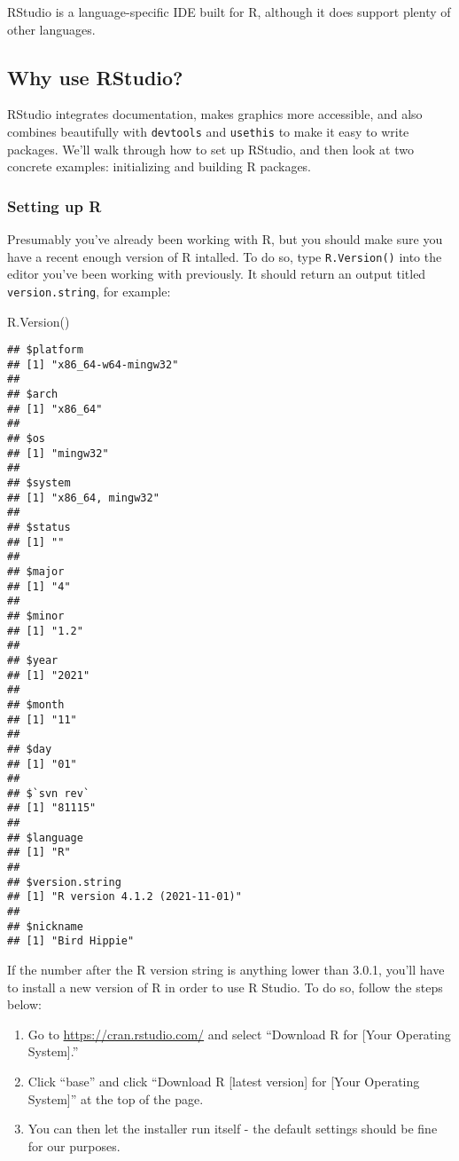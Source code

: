\documentclass[
]{book}
\newenvironment{Shaded}{\begin{snugshade}}{\end{snugshade}}
\newcommand{\FunctionTok}[1]{\textcolor[rgb]{0.00,0.00,0.00}{#1}}
\newcommand{\NormalTok}[1]{#1}
\begin{document}
RStudio is a language-specific IDE built for R, although it does support plenty of other languages.

\hypertarget{why-use-rstudio}{%
\subsection{Why use RStudio?}\label{why-use-rstudio}}

RStudio integrates documentation, makes graphics more accessible, and also combines beautifully with \texttt{devtools} and \texttt{usethis} to make it easy to write packages. We'll walk through how to set up RStudio, and then look at two concrete examples: initializing and building R packages.

\hypertarget{setting-up-r}{%
\subsubsection{Setting up R}\label{setting-up-r}}

Presumably you've already been working with R, but you should make sure you have a recent enough version of R intalled. To do so, type \texttt{R.Version()} into the editor you've been working with previously. It should return an output titled \texttt{version.string}, for example:

\begin{Shaded}
\begin{Highlighting}[]
\FunctionTok{R.Version}\NormalTok{()}
\end{Highlighting}
\end{Shaded}

\begin{verbatim}
## $platform
## [1] "x86_64-w64-mingw32"
## 
## $arch
## [1] "x86_64"
## 
## $os
## [1] "mingw32"
## 
## $system
## [1] "x86_64, mingw32"
## 
## $status
## [1] ""
## 
## $major
## [1] "4"
## 
## $minor
## [1] "1.2"
## 
## $year
## [1] "2021"
## 
## $month
## [1] "11"
## 
## $day
## [1] "01"
## 
## $`svn rev`
## [1] "81115"
## 
## $language
## [1] "R"
## 
## $version.string
## [1] "R version 4.1.2 (2021-11-01)"
## 
## $nickname
## [1] "Bird Hippie"
\end{verbatim}

If the number after the R version string is anything lower than 3.0.1, you'll have to install a new version of R in order to use R Studio. To do so, follow the steps below:

\begin{enumerate}
\def\labelenumi{\arabic{enumi}.}
\item
  Go to \url{https://cran.rstudio.com/} and select ``Download R for {[}Your Operating System{]}.''
\item
  Click ``base'' and click ``Download R {[}latest version{]} for {[}Your Operating System{]}'' at the top of the page.
\item
  You can then let the installer run itself - the default settings should be fine for our purposes.
\end{enumerate}
\end{document}

